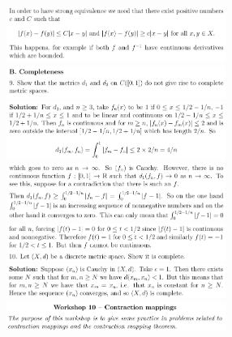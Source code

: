 \documentclass[8pt,landscape]{article}
\begin{document}
\begin{multicols}{3}
    \includegraphics[width=270]{099.png} \\
    \includegraphics[width=270]{100.png} \\
    \includegraphics[width=270]{101.png} \\
    \includegraphics[width=270]{102.png} \\
    \includegraphics[width=270]{103.png} \\
    \includegraphics[width=270]{104.png} \\
    \includegraphics[width=270]{105.png} \\

\end{multicols}
\end{document}
